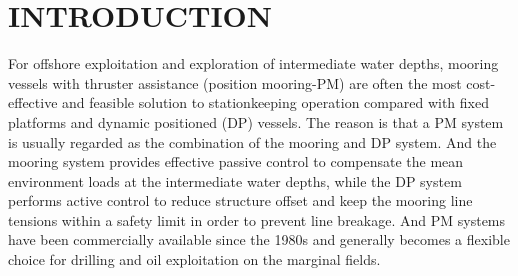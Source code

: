 \begin{sloppypar}
\begin{abstract}
\end{abstract}

\section{INTRODUCTION}
\label{sec:intro}

For offshore exploitation and exploration of intermediate water depths, mooring vessels with thruster assistance (position mooring-PM) are often the most cost-effective and feasible solution to stationkeeping operation compared with fixed platforms and dynamic positioned (DP) vessels\cite{nguyen2009switching}. The reason is that a PM system is usually regarded as the combination of the mooring and DP system. And the mooring system provides effective passive control to compensate the mean environment loads at the intermediate water depths, while the DP system performs active control to reduce structure offset and keep the mooring line tensions within a safety limit in order to prevent line breakage. And PM systems have been commercially available since the 1980s and generally becomes a flexible choice for drilling and oil exploitation on the marginal fields\cite{sorensen2011survey}.




\end{sloppypar}
